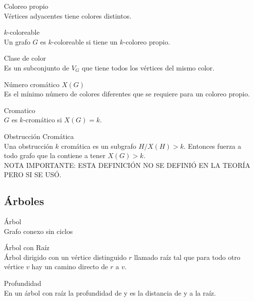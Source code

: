 \documentclass{article}
\begin{document}
\begin{defn}
Coloreo propio \\ Vértices adyacentes tiene colores distintos.
\end{defn}

\begin{defn}
$k$-coloreable \\ Un grafo $G$ es $k$-coloreable si tiene un $k$-coloreo propio.
\end{defn}

\begin{defn}
Clase de color \\ Es un subconjunto de $V_{G}$ que tiene todos los vértices del mismo color.
\end{defn}

\begin{defn}
Número cromático $X(G)$ \\ Es el mínimo número de colores diferentes que se requiere para un coloreo propio.
\end{defn}

\begin{defn}
Cromatico \\ $G$ es $k$-cromático si $X(G)=k$.
\end{defn}

\begin{defn}
Obstrucción Cromática \\ Una obstrucción $k$ cromática es un subgrafo $H / X(H)>k$. Entonces fuerza a todo grafo que la contiene a tener $X(G)>k$.\\ NOTA IMPORTANTE: ESTA DEFINICIÓN NO SE DEFINIÓ EN LA TEORÍA PERO SI SE USÓ.
\end{defn}

\subsection{Árboles}

\begin{defn}
Árbol \\ Grafo conexo sin ciclos
\end{defn}

\begin{defn}
Árbol con Raíz \\ Árbol dirigido con un vértice distinguido $r$ llamado raíz tal que para todo otro vértice $v$ hay un camino directo de $r$ a $v$.
\end{defn}

\begin{defn}
Profundidad \\ En un árbol con raíz la profundidad de y es la distancia de y a la raíz.
\end{defn}
\end{document}
